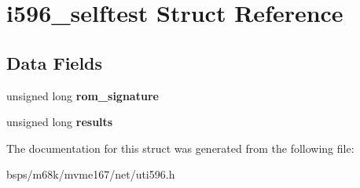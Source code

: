 \hypertarget{structi596__selftest}{}\section{i596\+\_\+selftest Struct Reference}
\label{structi596__selftest}
\subsection*{Data Fields}
\begin{DoxyCompactItemize}
\item 
\mbox{\label{structi596__selftest_a24486cd81f4d0e6468366bcb4021cc68}} 
unsigned long {\bfseries rom\+\_\+signature}
\item 
\mbox{\label{structi596__selftest_aecd4fadf611c9f10d3ba87cf49f82fce}} 
unsigned long {\bfseries results}
\end{DoxyCompactItemize}


The documentation for this struct was generated from the following file\+:\begin{DoxyCompactItemize}
\item 
bsps/m68k/mvme167/net/uti596.\+h\end{DoxyCompactItemize}
